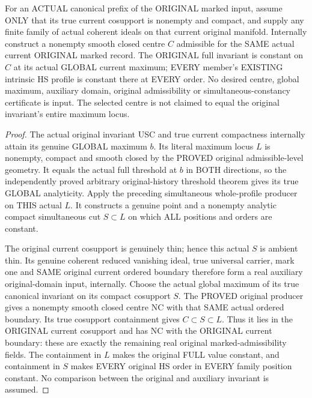 \begin{theorem}
\label{hir:original-current-compact-full-invariant-simultaneous-hs-first-centre}
\leanok
For an ACTUAL canonical prefix of the ORIGINAL marked input, assume ONLY
that its true current cosupport is nonempty and compact, and supply any
finite family of actual coherent ideals on that current original manifold.
Internally construct a nonempty smooth closed centre $C$ admissible for the
SAME actual current ORIGINAL marked record. The ORIGINAL full invariant
is constant on $C$ at its actual GLOBAL current maximum; EVERY member's
EXISTING intrinsic HS profile is constant there at EVERY order.
No desired centre, global maximum, auxiliary domain, original admissibility
or simultaneous-constancy certificate is input. The selected centre is not
claimed to equal the original invariant's entire maximum locus.
\end{theorem}
\begin{proof}
The actual original invariant USC and true current compactness internally
attain its genuine GLOBAL maximum $b$. Its literal maximum locus $L$ is
nonempty, compact and smooth closed by the PROVED original admissible-level
geometry. It equals the actual full threshold at $b$ in BOTH directions,
so the independently proved arbitrary original-history threshold theorem
gives its true GLOBAL analyticity. Apply the preceding simultaneous
whole-profile producer on THIS actual $L$. It constructs a genuine point
and a nonempty analytic compact simultaneous cut $S\subset L$ on which
ALL positions and orders are constant.

The original current cosupport is genuinely thin; hence this actual $S$
is ambient thin. Its genuine coherent reduced vanishing ideal, true
universal carrier, mark one and SAME original current ordered boundary
therefore form a real auxiliary original-domain input, internally.
Choose the actual global maximum of its true canonical invariant on its
compact cosupport $S$. The PROVED original producer gives a nonempty smooth
closed centre NC with that SAME actual ordered boundary. Its true cosupport
containment gives $C\subset S\subset L$. Thus it lies in the ORIGINAL current
cosupport and has NC with the ORIGINAL current boundary: these are exactly
the remaining real original marked-admissibility fields. The containment
in $L$ makes the original FULL value constant, and containment in $S$ makes
EVERY original HS order in EVERY family position constant. No comparison
between the original and auxiliary invariant is assumed.
\end{proof}

